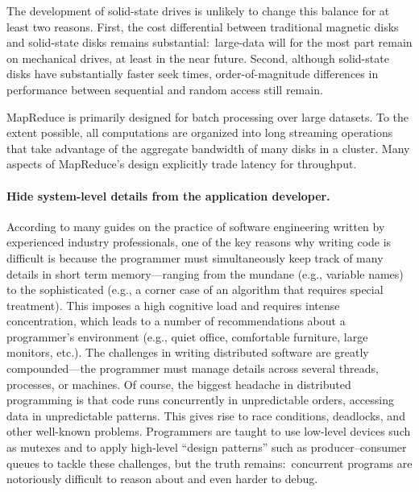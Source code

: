 The development of solid-state drives is unlikely to change this
balance for at least two reasons.  First, the cost differential
between traditional magnetic disks and solid-state disks remains
substantial:\ large-data will for the most part remain on mechanical
drives, at least in the near future.  Second, although solid-state
disks have substantially faster seek times, order-of-magnitude
differences in performance between sequential and random access still
remain.

MapReduce is primarily designed for batch processing over large
datasets.  To the extent possible, all computations are organized into
long streaming operations that take advantage of the aggregate
bandwidth of many disks in a cluster.  Many aspects of MapReduce's
design explicitly trade latency for throughput.

\paragraph{Hide system-level details from the application developer.}  
According to many guides on the practice of software engineering
written by experienced industry professionals, one of the key reasons
why writing code is difficult is because the programmer must
simultaneously keep track of many details in short term
memory---ranging from the mundane (e.g., variable names) to the
sophisticated (e.g., a corner case of an algorithm that requires
special treatment).  This imposes a high cognitive load and requires
intense concentration, which leads to a number of recommendations
about a programmer's environment (e.g., quiet office, comfortable
furniture, large monitors, etc.).  The challenges in writing
distributed software are greatly compounded---the programmer must
manage details across several threads, processes, or machines.  Of
course, the biggest headache in distributed programming is that code
runs concurrently in unpredictable orders, accessing data in
unpredictable patterns.  This gives rise to race conditions,
deadlocks, and other well-known problems.  Programmers are taught to
use low-level devices such as mutexes and to apply high-level ``design
patterns'' such as producer--consumer queues to tackle these
challenges, but the truth remains:\ concurrent programs are
notoriously difficult to reason about and even harder to debug.

